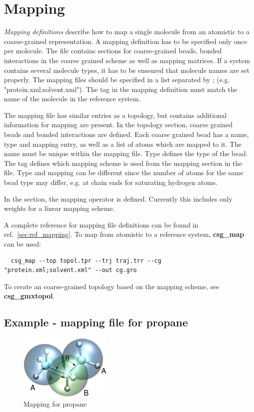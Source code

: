 \section{Mapping}
\label{sec:mapping}
{\em Mapping definitions} describe how to map a single molecule from an atomistic to a coarse-grained representation. A mapping definition has to be specified only once per molecule. The file contains sections for coarse-grained beads, bonded interactions in the coarse grained scheme as well as mapping matrices. If a system contains several molecule types, it has to be enssured that molecule names are set properly. The mapping files should be specified in a list separated by ; (e.g. "protein.xml;solvent.xml"). The  tag in the mapping definition must match the name of the molecule in the reference system.

The mapping file has similar entries as a topology, but contains additional information for mapping are present. In the topology section, coarse grained beads and bonded interactions are defined. Each coarse grained bead has a name, type and mapping entry, as well as a list of atoms which are mapped to it. The name must be unique within the mapping file. Type defines the type of the bead. The  tag defines which mapping scheme is used from the mapping section in the file. Type and mapping can be different since the number of atoms for the same bead type may differ, e.g. at chain ends for saturating hydrogen atoms.

In the  section, the mapping operator is defined. Currently this includes only weights for a linear mapping scheme.

A complete reference for mapping file definitions can be found in ref.~\ref{sec:ref_mapping}. To map from atomistic to a reference system, \textbf{csg\_map} can be used:
\begin{verbatim}
  csg_map --top topol.tpr --trj traj.trr --cg "protein.xml;solvent.xml" --out cg.gro
\end{verbatim}

To create an coarse-grained topology based on the mapping scheme, see \textbf{csg\_gmxtopol}.

\subsection{Example - mapping file for propane}
\begin{figure}[ht]
  \includegraphics[width=0.4\textwidth]{functionality/fig/propane.eps}
  \caption{Mapping for propane}
\end{figure}


